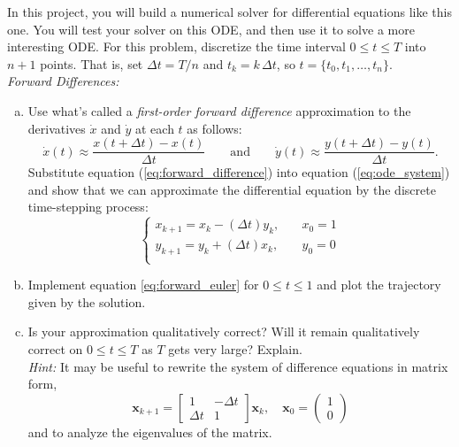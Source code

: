 In this project, you will build a numerical solver for differential equations like this one. You will test your solver on this ODE, and then use it to solve a more interesting ODE.
For this problem, discretize the time interval $0 \leq t \leq T$ into $n+1$ points. That is, set $\Delta t = T/n$ and $t_k = k \, \Delta t$, so $ t = \{t_0, t_1, \dots, t_n\}$. \\
\textit{Forward Differences:}
\begin{enumerate}[(a)]
    \item Use what's called a \textit{first-order forward difference} approximation to the derivatives $\dot{x}$ and $\dot{y}$ at each $t$ as follows:
    \begin{equation} 
    \label{eq:forward_difference}
    \dot{x}(t) \approx \frac{x(t + \Delta t) - x(t)}{\Delta t} \qquad \text{and} \qquad \dot{y}(t) \approx \frac{y(t + \Delta t) - y(t)}{\Delta t}.
    \end{equation}
     Substitute equation (\ref{eq:forward_difference}) into equation (\ref{eq:ode_system}) and show that we can approximate the differential equation by the discrete time-stepping process:
    \begin{equation}
    \label{eq:forward_euler}
    \begin{cases} x_{k+1} = x_k - (\Delta t) y_k, & \quad x_0 = 1\\  y_{k+1} = y_k + (\Delta t) x_k, & \quad y_0 = 0\\  \end{cases}
    \end{equation}
    \item Implement equation \ref{eq:forward_euler} for $0 \leq t \leq 1$ and plot the trajectory given by the solution.
    \item Is your approximation qualitatively correct? Will it remain qualitatively correct on $0 \leq t \leq T$ as $T$ gets very large? Explain.\\
    \textit{Hint:} It may be useful to rewrite the system of difference equations in matrix form,
    \begin{equation*}
    \bm{x}_{k+1} 
    = \begin{bmatrix} 1 & -\Delta t \\  \Delta t & 1\end{bmatrix} \bm{x}_k, \quad \bm{x}_0 = \begin{pmatrix} 1\\0 \end{pmatrix}
    \end{equation*}
    and to analyze the eigenvalues of the matrix.
\end{enumerate}
